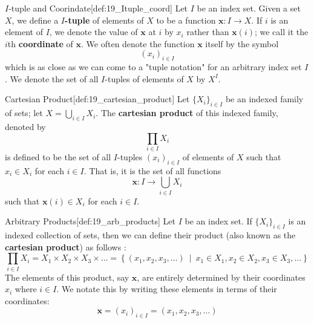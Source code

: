 \begin{defBox}{\( I \)-tuple and Coorindate}[def:19_Ituple_coord]
    Let \( I \) be an index set.
    Given a set \( X \), we define a \( I \)\textbf{-tuple} of elements of 
    \( X \) to be a function \( \mathbf{x}: I \rightarrow X \).
    If \( i \) is an element of \( I \), we denote the value of \( \mathbf{x} \)
    at \( i \) by \( x_{ i } \) rather than \( \mathbf{x} ( i ) \);
    we call it the \( i \)th \textbf{coordinate} of \( \mathbf{x} \).
    We often denote the function \( \mathbf{x} \) itself by the symbol
    \begin{equation*}
        ( x_{ i } )_{ i \in I }
    \end{equation*}
    which is as close as we can come to a "tuple notation" for an arbitrary
    index set \( I \).
    We denote the set of all \( I \)-tuples of elements of \( X \) by 
    \( X^{ I } \).
\end{defBox}

\begin{defBox}{Cartesian Product}[def:19_cartesian_product]
    Let \( \{ X_{ i } \}_{ i \in I } \) be an indexed family of sets;
    let \( X = \bigcup_{ i \in I } X_{ i } \).
    The \textbf{cartesian product} of this indexed family, denoted by 
    \begin{equation*}
        \prod_{ i \in I } X_{ i }
    \end{equation*}
    is defined to be the set of all \( I \)-tuples \( ( x_{ i } )_{ i \in I } \)
    of elements of \( X \) such that \( x_{ i } \in X_{ i } \) for each 
    \( i \in I \). That is, it is the set of all functions
    \begin{equation*}
        \mathbf{x}: I \rightarrow \bigcup_{ i \in I } X_{ i }
    \end{equation*}
    such that \( \mathbf{x} ( i ) \in X_{ i } \) for each \( i \in I \).
\end{defBox}

\begin{defBox}{Arbitrary Products}[def:19_arb_products]
    Let \( I \) be an index set.
    If \( \{ X_{ i } \}_{ i \in I } \) is an indexed collection of sets,
    then we can define their product (also known as the \textbf{cartesian 
    product}) as follows :
    \begin{equation*}
        \prod_{ i \in I } X_{ i }
        =
        X_{ 1 } \times X_{ 2 } \times X_{ 3 } \times \ldots
        =
        \left\{
            ( x_{ 1 } , x_{ 2 }, x_{ 3 }, \ldots )
            \ \middle\vert \ 
            x_{ 1 } \in X_{ 1 }, x_{ 2 } \in X_{ 2 }, x_{ 3 } \in X_{ 3 },
            \ldots
        \right\}
    \end{equation*}
    The elements of this product, say \( \mathbf{x} \), are entirely 
    determined by their coordinates \( x_{ i } \) where \( i \in I \).
    We notate this by writing these elements in terms of their coordinates:
    \begin{equation*}
        \mathbf{x}
        =
        ( x_{ i } )_{ i \in I }
        =
        ( x_{ 1 } , x_{ 2 }, x_{ 3 }, \ldots )
    \end{equation*}
\end{defBox}

